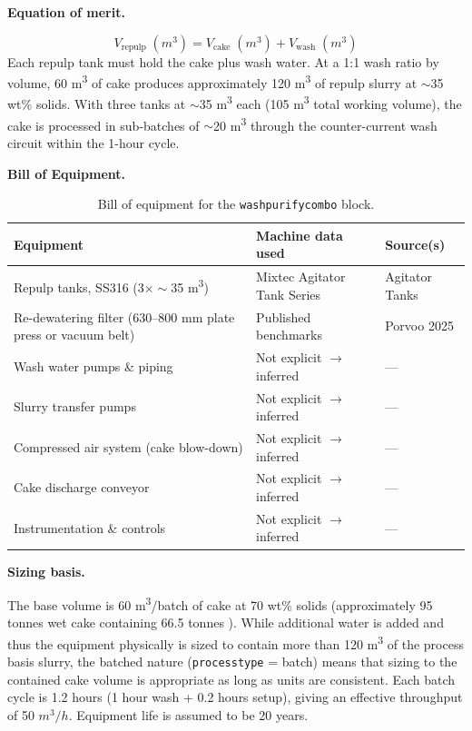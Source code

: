 \documentclass{article}
\renewcommand\_{\textunderscore\allowbreak}
\begin{document}
\medskip
\noindent\textbf{Equation of merit.}\quad

\[
	V_\text{repulp}\;(\si{m^3}) = V_\text{cake}\;(\si{m^3}) + V_\text{wash}\;(\si{m^3})
\]
Each repulp tank must hold the cake plus wash water. At a 1:1 wash ratio by volume, 60 \si{m^3} of cake produces approximately 120 \si{m^3} of repulp slurry at $\sim$35 wt\% solids. With three tanks at $\sim$35 \si{m^3} each (105 \si{m^3} total working volume), the cake is processed in sub-batches of $\sim$20 \si{m^3} through the counter-current wash circuit within the 1-hour cycle.

\medskip
\noindent\textbf{Bill of Equipment.}\quad

\begin{table}[h!]
\caption{Bill of equipment for the \texttt{wash\_purify\_combo} block.}
\centering
\begin{tabular}{>{\raggedright\arraybackslash}p{5.2cm}
				>{\raggedright\arraybackslash}p{4cm}
				>{\raggedright\arraybackslash}p{4.5cm}}
\toprule
\textbf{Equipment} & \textbf{Machine data used} & \textbf{Source(s)} \\
\midrule
Repulp tanks, SS316 ($3 \times \sim$35 \si{m^3}) & Mixtec Agitator Tank Series & Agitator Tanks \\
Re-dewatering filter (630--800 mm plate press or vacuum belt) & Published benchmarks & Porvoo 2025 \\
Wash water pumps \& piping & Not explicit $\rightarrow$ inferred & --- \\
Slurry transfer pumps & Not explicit $\rightarrow$ inferred & --- \\
Compressed air system (cake blow-down) & Not explicit $\rightarrow$ inferred & --- \\
Cake discharge conveyor & Not explicit $\rightarrow$ inferred & --- \\
Instrumentation \& controls & Not explicit $\rightarrow$ inferred & --- \\
\bottomrule
\end{tabular}
\end{table}

\medskip
\noindent\textbf{Sizing basis.}\quad

The base volume is 60 \si{m^3/batch} of  cake at 70 wt\% solids (approximately 95 tonnes wet cake containing 66.5 tonnes ). While additional water is added and thus the equipment physically is sized to contain more than 120 \si{m^3} of the process basis slurry, the batched nature (\texttt{process\_type} = batch) means that sizing to the contained cake volume is appropriate as long as units are consistent. Each batch cycle is 1.2 hours (1 hour wash + 0.2 hours setup), giving an effective throughput of 50 $\si{m^3/h}$. Equipment life is assumed to be 20 years.
\end{document}
